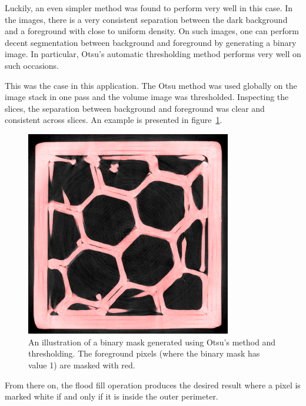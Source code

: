 \documentclass[a4paper,twoside,12pt]{article}
\begin{document}
Luckily, an even simpler method was found to perform very well in this case. In the images, there is a very consistent separation between the dark background and a foreground with close to uniform density. On such images, one can perform decent segmentation between background and foreground by generating a binary image. In particular, Otsu's automatic thresholding method performs very well on such occasions.

This was the case in this application. The Otsu method was used globally on the image stack in one pass and the volume image was thresholded. Inspecting the slices, the separation between background and foreground was clear and consistent across slices. An example is presented in figure~\ref{fig:otsu}.
\begin{figure}
    \centering
    \includegraphics[width=0.8\textwidth]{images/binary_initial_24.png}
    \caption{An illustration of a binary mask generated using Otsu's method and thresholding. The foreground pixels (where the binary mask has value 1) are masked with red.}
    \label{fig:otsu}
\end{figure}
From there on, the flood fill operation produces the desired result where a pixel is marked white if and only if it is inside the outer perimeter.
\end{document}
